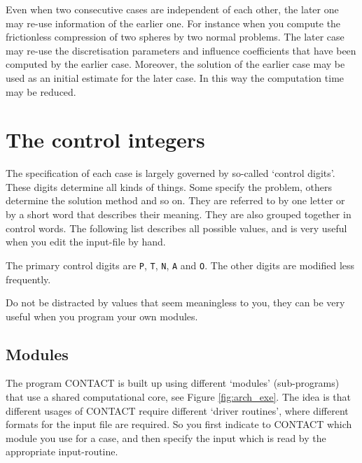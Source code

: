 \documentclass[12pt]{report}
\begin{document}
Even when two consecutive cases are independent of each other, the later
one may re-use information of the earlier one. For instance when you compute
the frictionless compression of two spheres by two normal problems. The
later case may re-use the discretisation parameters and influence
coefficients that have been computed by the earlier case. Moreover, the
solution of the earlier case may be used as an initial estimate for the
later case. In this way the computation time may be reduced.


\section{The control integers}
\label{sec:controldigits}

The specification of each case is largely governed by so-called `control
digits'. These digits determine all kinds of things. Some specify the
problem, others determine the solution method and so on. They are referred
to by one letter or by a short word that describes their meaning. They are
also grouped together in control words. The following list
describes all possible values, and is very useful when you edit the
input-file by hand.

The primary control digits are {\tt P}, {\tt T}, {\tt N}, {\tt A}
and {\tt O}. The other digits are modified less frequently.

Do not be distracted by values that seem meaningless to you, they can be
very useful when you program your own modules.

\subsection{Modules}
\label{sec:modules}

The program CONTACT is built up using different `modules' (sub-programs)
that use a shared computational core, see Figure \ref{fig:arch_exe}. The
idea is that different usages of CONTACT require different `driver
routines', where different formats for the input file are required. So you
first indicate to CONTACT which module you use for a case, and then specify
the input which is read by the appropriate input-routine.
\end{document}
